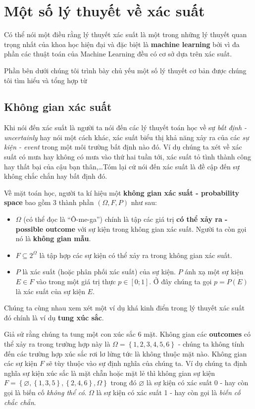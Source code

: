 \documentclass[../main-report.tex]{subfiles}
\begin{document}
\section{Một số lý thuyết về xác suất}
Có thể nói một điều rằng lý thuyết xác suất là một trong những lý thuyết quan trọng nhất của khoa học hiện đại và đặc biệt là \textbf{machine learning} bởi vì đa phần các thuật toán của Machine Learning đều có cơ sở dựa trên xác suất.

Phần bên dưới chúng tôi trình bày chủ yếu một số lý thuyết cơ bản được chúng tôi tìm hiểu và tổng hợp từ \citep{MLCB:xacsuat}
\subsection{Không gian xác suất}
Khi nói đến xác suất là người ta nói đến các lý thuyết toán học về sự \textit{bất định - uncertainly} hay nói một cách khác, xác suất biểu thị khả năng xảy ra của các \textit{sự kiện - event} trong một môi trường bất định nào đó. Ví dụ chúng ta xét về xác suất có mưa hay không có mưa vào thứ hai tuần tới, xác suất tỏ tình thành công hay thất bại của cậu bạn thân,\ldots Tóm lại cứ nói đến xác suất là đề cập đến sự không chắc chắn hay bất định đó.

Về mặt toán học, người ta kí hiệu một \textbf{không gian xác suất - probability space} bao gồm 3 thành phần $(\Omega, F, P)$ như sau:

\begin{itemize}
\item $\Omega$ (có thể đọc là ``Ô-me-ga'') chính là tập các giá trị \textbf{có thể xảy ra - possible outcome} với sự kiện trong không gian xác suất. Người ta còn gọi nó là \textbf{không gian mẫu}.
\item $F \subseteq 2^{\Omega}$ là tập hợp các sự kiện có thể xảy ra trong không gian xác suất.
\item $P$ là xác suất (hoặc phân phối xác suất) của sự kiện. $P$ ánh xạ một sự kiện $E \in F$ vào trong một giá trị thực $p \in \left [ 0;1 \right ]$. Ở đây chúng ta gọi $p = P(E)$ là xác suất của sự kiện $E$.
\end{itemize}


Chúng ta cùng nhau xem xét một ví dụ khá kinh điển trong lý thuyết xác suất đó chính là ví dụ \textbf{tung xúc sắc}.

\begin{example}
Giả sử rằng chúng ta tung một con xúc sắc 6 mặt. Không gian các \textbf{outcomes} có thể xảy ra trong trường hợp này là $\Omega = \left \{ 1, 2, 3, 4, 5, 6 \right \}$ - chúng ta không tính đến các trường hợp xúc sắc rơi lơ lửng tức là không thuộc mặt nào. Không gian các sự kiện $F$ sẽ tùy thuộc vào sự định nghĩa của chúng ta. Ví dụ chúng ta định nghĩa sự kiện xúc sắc là mặt chẵn hoặc mặt lẻ thì không gian sự kiện $F=\left \{ \varnothing , \left \{ 1, 3, 5 \right \}, \left \{ 2, 4, 6 \right \}, \Omega \right \}$ trong đó $\varnothing$ là sự kiện có xác suất 0 - hay còn gọi là biến cố \textit{không thể có}. $\Omega$ là sự kiện có xác suất 1 - hay còn gọi là \textit{biến cố chắc chắn}.
\end{example}
\end{document}
